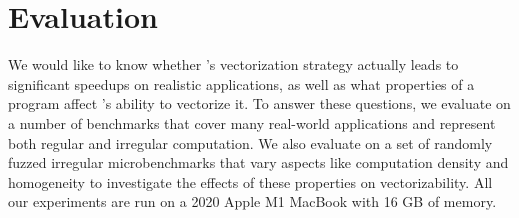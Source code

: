 \section{Evaluation}\label{sec:eval}


We would like to know whether \system's vectorization strategy actually leads to significant speedups on realistic applications, as well as what properties of a program affect \system's ability to vectorize it.
To answer these questions, we evaluate \system on a number of benchmarks that cover many real-world applications and represent both regular and irregular computation.
We also evaluate \system on a set of randomly fuzzed irregular microbenchmarks that vary aspects like computation density and homogeneity to investigate the effects of these properties on vectorizability. 
All our experiments are run on a 2020 Apple M1 MacBook with 16 GB of memory. 


